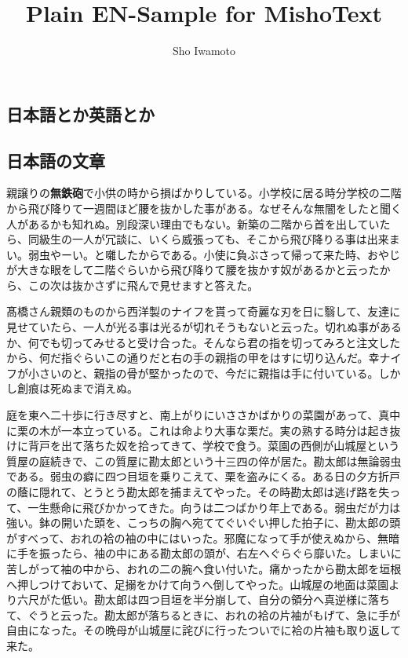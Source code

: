 \documentclass[11pt,pdfa,en]{MishoText}
\title{Plain EN-Sample for MishoText}
\author{Sho Iwamoto}
\begin{document}
\maketitle

\begin{japanese}
\chapter{日本語とか英語とか}
\section{日本語の文章}
親譲りの\textbf{無鉄砲}で小供の時から損ばかりしている。小学校に居る時分学校の二階から飛び降りて一週間ほど腰を抜かした事がある。なぜそんな無闇をしたと聞く人があるかも知れぬ。別段深い理由でもない。新築の二階から首を出していたら、同級生の一人が冗談に、いくら威張っても、そこから飛び降りる事は出来まい。弱虫やーい。と囃したからである。小使に負ぶさって帰って来た時、おやじが大きな眼をして二階ぐらいから飛び降りて腰を抜かす奴があるかと云ったから、この次は抜かさずに飛んで見せますと答えた。

髙橋さん親類のものから西洋製のナイフを貰って奇麗な刃を日に翳して、友達に見せていたら、一人が光る事は光るが切れそうもないと云った。切れぬ事があるか、何でも切ってみせると受け合った。そんなら君の指を切ってみろと注文したから、何だ指ぐらいこの通りだと右の手の親指の甲をはすに切り込んだ。幸ナイフが小さいのと、親指の骨が堅かったので、今だに親指は手に付いている。しかし創痕は死ぬまで消えぬ。

庭を東へ二十歩に行き尽すと、南上がりにいささかばかりの菜園があって、真中に栗の木が一本立っている。これは命より大事な栗だ。実の熟する時分は起き抜けに背戸を出て落ちた奴を拾ってきて、学校で食う。菜園の西側が山城屋という質屋の庭続きで、この質屋に勘太郎という十三四の倅が居た。勘太郎は無論弱虫である。弱虫の癖に四つ目垣を乗りこえて、栗を盗みにくる。ある日の夕方折戸の蔭に隠れて、とうとう勘太郎を捕まえてやった。その時勘太郎は逃げ路を失って、一生懸命に飛びかかってきた。向うは二つばかり年上である。弱虫だが力は強い。鉢の開いた頭を、こっちの胸へ宛ててぐいぐい押した拍子に、勘太郎の頭がすべって、おれの袷の袖の中にはいった。邪魔になって手が使えぬから、無暗に手を振ったら、袖の中にある勘太郎の頭が、右左へぐらぐら靡いた。しまいに苦しがって袖の中から、おれの二の腕へ食い付いた。痛かったから勘太郎を垣根へ押しつけておいて、足搦をかけて向うへ倒してやった。山城屋の地面は菜園より六尺がた低い。勘太郎は四つ目垣を半分崩して、自分の領分へ真逆様に落ちて、ぐうと云った。勘太郎が落ちるときに、おれの袷の片袖がもげて、急に手が自由になった。その晩母が山城屋に詫びに行ったついでに袷の片袖も取り返して来た。
\end{japanese}
\end{document}
